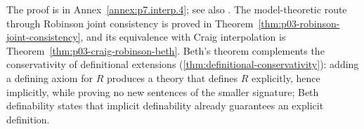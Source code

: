 The proof is in Annex~\ref{annex:p7.interp.4}; see also
\cite{Beth1953,Hodges1993}.
The model-theoretic route through Robinson joint consistency is proved in
Theorem~\ref{thm:p03-robinson-joint-consistency}, and its equivalence with
Craig interpolation is Theorem~\ref{thm:p03-craig-robinson-beth}.
Beth's theorem complements the conservativity of definitional extensions
(\cref{thm:definitional-conservativity}): adding a defining axiom for
\(R\) produces a theory that defines \(R\) explicitly, hence implicitly,
while proving no new sentences of the smaller signature; Beth definability
states that implicit definability already guarantees an explicit
definition.
